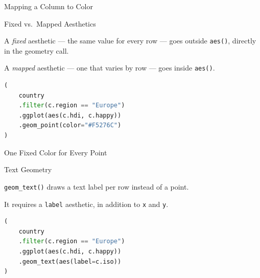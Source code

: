 \documentclass[8pt,aspectratio=169]{beamer}
\begin{document}
\begin{rightframe}{Mapping a Column to Color}
\end{rightframe}

\begin{frame}[fragile]{Fixed vs.\ Mapped Aesthetics}
\begin{splitcode}{%

A \textit{fixed} aesthetic --- the same value for every row --- goes outside \texttt{aes()}, directly in the geometry call.

A \textit{mapped} aesthetic --- one that varies by row --- goes inside \texttt{aes()}.

}
\begin{lstlisting}[language=Python]
(
    country
    .filter(c.region == "Europe")
    .ggplot(aes(c.hdi, c.happy))
    .geom_point(color="#F5276C")
)
\end{lstlisting}
\end{splitcode}
\end{frame}

\begin{rightframe}{One Fixed Color for Every Point}
\end{rightframe}

\begin{frame}[fragile]{Text Geometry}
\begin{splitcode}{%

\texttt{geom\_text()} draws a text label per row instead of a point.

It requires a \texttt{label} aesthetic, in addition to \texttt{x} and \texttt{y}.

}
\begin{lstlisting}[language=Python]
(
    country
    .filter(c.region == "Europe")
    .ggplot(aes(c.hdi, c.happy))
    .geom_text(aes(label=c.iso))
)
\end{lstlisting}
\end{splitcode}
\end{frame}
\end{document}
